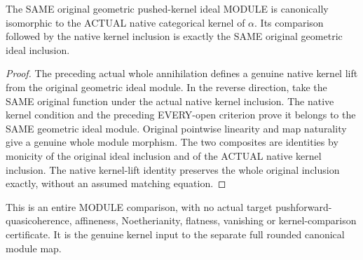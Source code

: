 \begin{theorem}
\label{sc0-pushed-kernel-module:whole-native-kernel}
\leanok
The SAME original geometric pushed-kernel ideal MODULE is
canonically isomorphic to the ACTUAL native categorical kernel
of $\alpha$. Its comparison followed by the native kernel inclusion
is exactly the SAME original geometric ideal inclusion.
\end{theorem}
\begin{proof}
The preceding actual whole annihilation defines a genuine native
kernel lift from the original geometric ideal module. In the
reverse direction, take the SAME original function under the
actual native kernel inclusion. The native kernel condition
and the preceding EVERY-open criterion prove it belongs to
the SAME geometric ideal module. Original pointwise linearity
and map naturality give a genuine whole module morphism.
The two composites are identities by monicity of the original
ideal inclusion and of the ACTUAL native kernel inclusion.
The native kernel-lift identity preserves the whole original
inclusion exactly, without an assumed matching equation.
\end{proof}

This is an entire MODULE comparison, with no actual target
pushforward-quasicoherence, affineness, Noetherianity, flatness,
vanishing or kernel-comparison certificate. It is the genuine
kernel input to the separate full rounded canonical module map.

